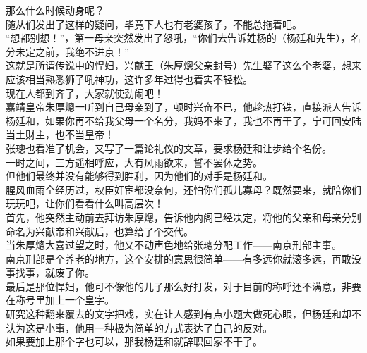 \begin{multicols}{\theparacolNo}
那么什么时候动身呢？\\

随从们发出了这样的疑问，毕竟下人也有老婆孩子，不能总拖着吧。\\

“想都别想！”，第一母亲突然发出了怒吼，“你们去告诉姓杨的（杨廷和先生），名分未定之前，我绝不进京！”\\

这就是所谓传说中的悍妇，兴献王（朱厚熜父亲封号）先生娶了这么个老婆，想来应该相当熟悉狮子吼神功，这许多年过得也着实不轻松。\\

现在人都到齐了，大家就使劲闹吧！\\

嘉靖皇帝朱厚熜一听到自己母亲到了，顿时兴奋不已，他趁热打铁，直接派人告诉杨廷和，如果你再不给我父母一个名分，我妈不来了，我也不再干了，宁可回安陆当土财主，也不当皇帝！\\

张璁也看准了机会，又写了一篇论礼仪的文章，要求杨廷和让步给个名份。\\

一时之间，三方遥相呼应，大有风雨欲来，誓不罢休之势。\\

但他们最终并没有能够得到胜利，因为他们的对手是杨廷和。\\

腥风血雨全经历过，权臣奸宦都没奈何，还怕你们孤儿寡母？既然要来，就陪你们玩玩吧，让你们看看什么叫高层次！\\

首先，他突然主动前去拜访朱厚熜，告诉他内阁已经决定，将他的父亲和母亲分别命名为兴献帝和兴献后，也算给了个交代。\\

当朱厚熜大喜过望之时，他又不动声色地给张璁分配工作——南京刑部主事。\\

南京刑部是个养老的地方，这个安排的意思很简单——有多远你就滚多远，再敢没事找事，就废了你。\\

最后是那位悍妇，他可不像他的儿子那么好打发，对于目前的称呼还不满意，非要在称号里加上一个皇字。\\

研究这种翻来覆去的文字把戏，实在让人感到有点小题大做死心眼，但杨廷和却不认为这是小事，他用一种极为简单的方式表达了自己的反对。\\

如果要加上那个字也可以，那我杨廷和就辞职回家不干了。\\


\end{multicols}
